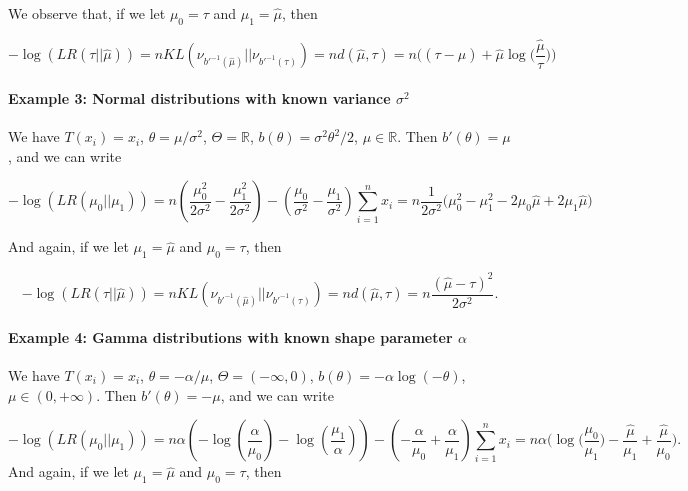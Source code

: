 \documentclass[12pt,]{article}
\let\oldparagraph\paragraph
\renewcommand{\paragraph}[1]{\oldparagraph{#1}\mbox{}}
\begin{document}
We observe that, if we let \(\mu_0 = \tau\) and \(\mu_1 = \hat{\mu}\),
then

\[
-\log(LR(\tau||\hat{\mu})) = nKL(\nu_{b'^{-1}(\hat{\mu})}||\nu_{b'^{-1}(\tau)}) = nd(\hat{\mu},\tau) = n\Big((\tau - \hat{\mu}) + \hat{\mu}\log\Big(\frac{\hat{\mu}}{\tau}\Big)\Big)
\]

\paragraph{\texorpdfstring{Example 3: Normal distributions with known
variance
\(\sigma^2\)}{Example 3: Normal distributions with known variance \textbackslash{}sigma\^{}2}}\label{example-3-normal-distributions-with-known-variance-sigma2}

We have \(T(x_i) = x_i\), \(\theta = \mu/\sigma^2\),
\(\Theta = \mathbb{R}\), \(b(\theta) = \sigma^2\theta^2/2\),
\(\mu \in \mathbb{R}\). Then \(b'(\theta) = \mu\), and we can write

\[
-\log(LR(\mu_0||\mu_1)) = n (\frac{\mu_0^2}{2\sigma^2} - \frac{\mu_1^2}{2\sigma^2}) - (\frac{\mu_0}{\sigma^2} - \frac{\mu_1}{\sigma^2})\sum_{i=1}^nx_i = n\frac{1}{2\sigma^2}\Big(\mu_0^2-\mu_1^2 - 2\mu_0\hat{\mu} + 2\mu_1\hat{\mu}\Big)
\]

And again, if we let \(\mu_1 = \hat{\mu}\) and \(\mu_0 = \tau\), then

\[
-\log(LR(\tau||\hat{\mu})) = nKL(\nu_{b'^{-1}(\hat{\mu})}||\nu_{b'^{-1}(\tau)}) = nd(\hat{\mu},\tau) = n\frac{(\hat{\mu} - \tau)^2}{2\sigma^2}.
\]

\paragraph{\texorpdfstring{Example 4: Gamma distributions with known
shape parameter
\(\alpha\)}{Example 4: Gamma distributions with known shape parameter \textbackslash{}alpha}}\label{example-4-gamma-distributions-with-known-shape-parameter-alpha}

We have \(T(x_i) = x_i\), \(\theta = -\alpha/\mu\),
\(\Theta = (-\infty, 0)\), \(b(\theta) = -\alpha \log(-\theta)\),
\(\mu \in (0,+\infty)\). Then \(b'(\theta) = -\mu\), and we can write

\[
-\log(LR(\mu_0||\mu_1)) = n\alpha(-\log(\frac{\alpha}{\mu_0}) - \log(\frac{\mu_1}{\alpha})) - (-\frac{\alpha}{\mu_0} + \frac{\alpha}{\mu_1})\sum_{i=1}^{n}x_i = n\alpha \Big(\log\big(\frac{\mu_0}{\mu_1}\big) - \frac{\hat{\mu}}{\mu_1} + \frac{\hat{\mu}}{\mu_0}\Big).
\] And again, if we let \(\mu_1 = \hat{\mu}\) and \(\mu_0 = \tau\), then
\end{document}
